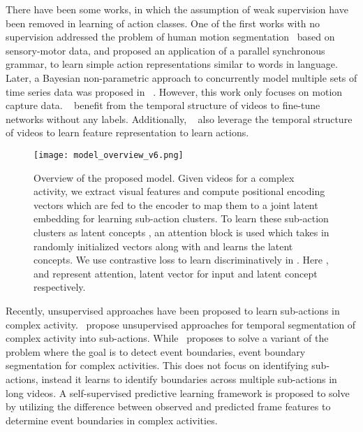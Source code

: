 \documentclass[final]{cvpr}
\begin{document}
\par There have been some works, in which the assumption of  weak supervision have been removed in learning of action classes. One of the first works with no supervision addressed the problem of human motion segmentation~\cite{rl-u-guerra2007language} based on sensory-motor data, and proposed an application of a parallel synchronous grammar,  to learn simple action representations similar to words in language. Later,   a Bayesian non-parametric approach to concurrently model multiple sets of time series data was proposed in ~\cite{rl-u-fox2014joint}. However, this work only focuses on motion capture data. ~\cite{rl-u-wang2015unsupervised, brattoli2017lstm}  benefit from the temporal structure of videos to fine-tune networks without any labels. Additionally, ~\cite{rl-ua-ramanathan2015learning, rl-ua-fernando2015modeling, rl-ua-cherian2017generalized, rl-ua-lee2017unsupervised} also leverage the temporal structure of videos to learn feature representation to learn actions. 


\begin{figure*}[t]
  \texttt{[image: model\_overview\_v6.png]}
\caption{{\small Overview of the proposed model. Given videos for a complex activity, we extract visual features  and compute positional encoding vectors  which are fed to the encoder to map them to a joint latent embedding for learning sub-action clusters. To learn these sub-action clusters as latent concepts , an attention block  is used which takes in randomly initialized vectors  along with  and learns the latent concepts. We use contrastive loss to learn  discriminatively in . Here ,  and  represent attention, latent vector for input  and  latent concept respectively.
}}
\vspace{-0.4cm}
\label{fig:arch}
\end{figure*}

\par Recently, unsupervised approaches have been proposed to learn sub-actions in complex activity.~\cite{sener2018unsupervised, kukleva2019unsupervised, vidalmata2020joint} propose unsupervised approaches for temporal segmentation of complex activity into sub-actions. While~\cite{aakur2019perceptual} proposes to solve a variant of the problem where the goal is to detect event boundaries, \ie event boundary segmentation for complex activities. This does not focus on identifying sub-actions, instead it learns to identify boundaries across multiple sub-actions in long videos. 
A self-supervised predictive learning framework is proposed to solve by utilizing the difference between observed and predicted frame features to determine event boundaries in complex activities.
\end{document}
